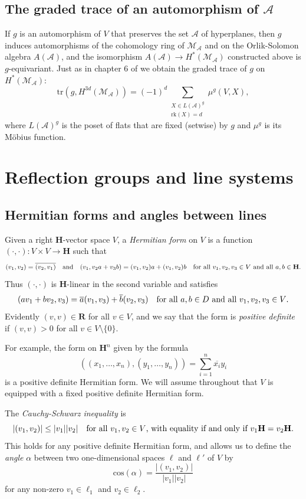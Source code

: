 \documentclass[11pt, reqno]{amsart}
\numberwithin{equation}{section}
\theoremstyle{definition}
\theoremstyle{plain}
\newcommand{\HH}{\mathbf{H}}
\newcommand{\RR}{\mathbf{R}}
\newcommand{\A}{\mathcal{A}}
\newcommand{\cM}{\mathcal{M}}
\begin{document}
\subsection{The graded trace of an automorphism of $\A$} 

If $g$ is an automorphism of $V$ that preserves the set $\A$ of hyperplanes, then $g$ induces automorphisms of the cohomology ring of $\cM_\A$ and on the Orlik-Solomon algebra $A(\A)$, and the isomorphism $A(\A) \to H^*(\cM_\A)$ constructed above is $g$-equivariant. Just as in chapter 6 of \cite{OrTe} we obtain the graded trace of $g$ on $H^*(\cM_\A)$:
$$\mathrm{tr}(g,H^{3d}(\cM_\A))=(-1)^d \sum_{\substack{X \in L(\A)^g \\ \mathrm{rk}(X)=d}} \mu^g(V,X),$$ where $L(\A)^g$ is the poset of flats that are fixed (setwise) by $g$ and $\mu^g$ is its M\"obius function.  

\section{Reflection groups and line systems}

\subsection{Hermitian forms and angles between lines} 

Given a right $\HH$-vector space $V$, a \emph{Hermitian form} on $V$ is a function $(\cdot,\cdot):V \times V \to \HH$ such that
$$(v_1,v_2)=\overline{(v_2,v_1)} \quad \text{and} \quad (v_1,v_2a+v_3b)=(v_1,v_2)a+(v_1,v_2)b \quad \hbox{for all $v_1,v_2,v_3 \in V$ and all $a,b \in \HH$.}$$ Thus $(\cdot,\cdot)$ is $\HH$-linear in the second variable and satisfies
$$(av_1+bv_2,v_3)=\overline{a} (v_1,v_3)+\overline{b} (v_2,v_3) \quad \hbox{for all $a,b \in D$ and all $v_1,v_2,v_3 \in V$.}$$ Evidently $(v,v) \in \RR$ for all $v \in V$, and we say that the form is \emph{positive definite} if $(v,v)>0$ for all $v \in V \setminus \{ 0 \}$. 

For example, the form on $\HH^n$ given by the formula
$$((x_1,\dots,x_n),(y_1,\dots,y_n))=\sum_{i=1}^n \overline{x_i} y_i$$ is a positive definite Hermitian form. We will assume throughout that $V$ is equipped with a fixed positive definite Hermitian form. 

The \emph{Cauchy-Schwarz inequality} is
$$|(v_1,v_2)| \leq |v_1| | v_2| \quad \hbox{for all $v_1,v_2 \in V$, with equality if and only if $v_1 \HH=v_2 \HH$.}$$ This holds for any positive definite Hermitian form, and allows us to define the \emph{angle} $\alpha$ between two one-dimensional spaces $\ell$ and $\ell'$ of $V$ by 
\begin{equation} \label{angle definition}
\mathrm{cos}(\alpha)=\frac{|(v_1,v_2)|}{|v_1| |v_2|}
\end{equation} for any non-zero $v_1 \in \ell_1$ and $v_2 \in \ell_2$. 
\end{document}
